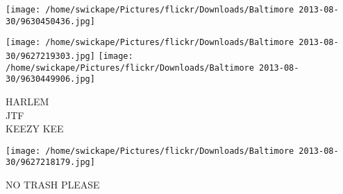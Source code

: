 \documentclass[10pt,letterpaper]{article}
\begin{document}
\texttt{[image: /home/swickape/Pictures/flickr/Downloads/Baltimore 2013-08-30/9630450436.jpg]}

\vspace{0.25in}
\texttt{[image: /home/swickape/Pictures/flickr/Downloads/Baltimore 2013-08-30/9627219303.jpg]}
\texttt{[image: /home/swickape/Pictures/flickr/Downloads/Baltimore 2013-08-30/9630449906.jpg]}

HARLEM\\
JTF\\
KEEZY KEE
\pagebreak

\texttt{[image: /home/swickape/Pictures/flickr/Downloads/Baltimore 2013-08-30/9627218179.jpg]}

NO TRASH PLEASE
\pagebreak
\end{document}
